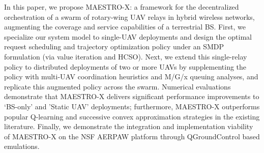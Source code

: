 \documentclass[12pt, draftcls, onecolumn]{IEEEtran}
\theoremstyle{plain}
\theoremstyle{definition}
\theoremstyle{remark}
\begin{document}
In this paper, we propose MAESTRO-X: a framework for the decentralized orchestration of a swarm of rotary-wing UAV relays in hybrid wireless networks, augmenting the coverage and service capabilities of a terrestrial BS. First, we specialize our system model to single-UAV deployments and design the optimal request scheduling and trajectory optimization policy under an SMDP formulation (via value iteration and HCSO). Next, we extend this single-relay policy to distributed deployments of two or more UAVs by supplementing the policy with multi-UAV coordination heuristics and M/G/x queuing analyses, and replicate this augmented policy across the swarm. Numerical evaluations demonstrate that MAESTRO-X delivers significant performance improvements to `BS-only' and 'Static UAV' deployments; furthermore, MAESTRO-X outperforms popular Q-learning and successive convex approximation strategies in the existing literature. Finally, we demonstrate the integration and implementation viability of MAESTRO-X on the NSF AERPAW platform through QGroundControl based emulations.
\vspace{-4mm}



 
\end{document}
